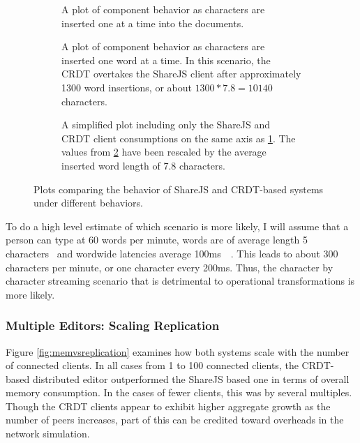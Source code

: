 \documentclass[12pt,a4paper,twoside,openright]{report}
\begin{document}
				\begin{figure} [H]
				\centering
				\begin{subfigure}[t]{.45\textwidth}
				  \centering
				  
				  \caption[Single Client Memory Consumption with Character Insertion] {A plot of component behavior as characters are inserted one at a time into the documents.}
				  \label{fig:sub1}
				\end{subfigure}%
				\begin{subfigure}[t]{.45\textwidth}
				  \centering
				  
				  \caption{A plot of component behavior as characters are inserted one word at a time. In this scenario, the CRDT overtakes the ShareJS client after approximately 1300 word insertions, or about $1300*7.8 = 10140$ characters.}
				  \label{fig:sub2}
				\end{subfigure}
				\begin{subfigure}[t]{0.6\textwidth}
				  \centering
			  	  
				  \caption{A simplified plot including only the ShareJS and CRDT client consumptions on the same axis as \ref{fig:sub1}. The values from \ref{fig:sub2} have been rescaled by the average inserted word length of 7.8 characters.}
				  \label{fig:sub3}
				\end{subfigure}
				\caption[Single Client Memory Consumption]{Plots comparing the behavior of ShareJS and CRDT-based systems under different behaviors.}
				\label{fig:singleclientmemory}
				\end{figure}
				
				To do a high level estimate of which scenario is more likely, I will assume that a person can type at 60 words per minute, words are of average length 5 characters~\cite{bochkarev2012average} and wordwide latencies average 100ms~\cite{latencies}~\cite{fccbroadband}. This leads to about 300 characters per minute, or one character every 200ms. Thus, the character by character streaming scenario that is detrimental to operational transformations is more likely.
					
					
				
				
			\subsubsection{Multiple Editors: Scaling Replication}
				Figure \ref{fig:memvsreplication} examines how both systems scale with the number of connected clients. In all cases from 1 to 100 connected clients, the CRDT-based distributed editor outperformed the ShareJS based one in terms of overall memory consumption. In the cases of fewer clients, this was by several multiples. Though the CRDT clients appear to exhibit higher aggregate growth as the number of peers increases, part of this can be credited toward overheads in the network simulation.
			
\end{document}
